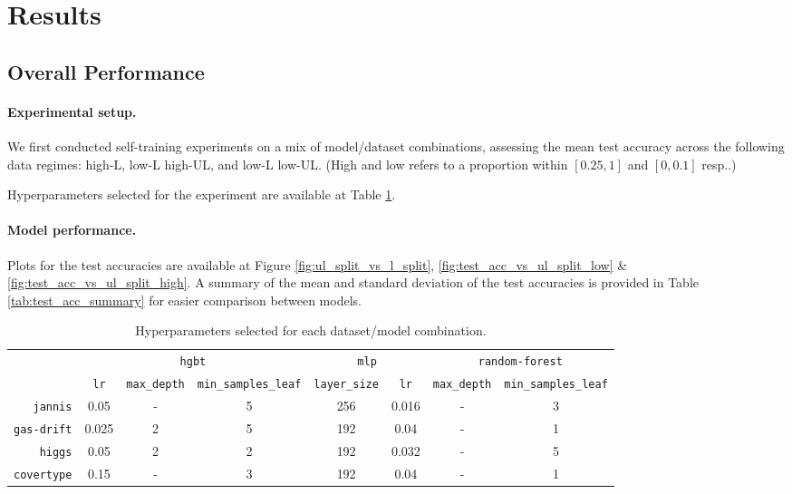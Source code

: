 \documentclass{article}
\begin{document}
\section{Results}\label{sec:res}

\subsection{Overall Performance}\label{sec:overall-perf}

\paragraph{Experimental setup.}
We first conducted self-training experiments on a mix of model/dataset combinations,
assessing the mean test accuracy across the following data regimes: high-L, low-L
high-UL, and low-L low-UL.
(High and low refers to a proportion within $[0.25, 1]$ and $[0, 0.1]$ resp..)

Hyperparameters selected for the experiment are available at Table
\ref{tab:test_acc_hyperparams}.

\paragraph{Model performance.}
Plots for the test accuracies are available at Figure \ref{fig:ul_split_vs_l_split},
\ref{fig:test_acc_vs_ul_split_low} \& \ref{fig:test_acc_vs_ul_split_high}.
A summary of the mean and standard deviation of the test accuracies is provided in Table
\ref{tab:test_acc_summary} for easier comparison between models.

\clearpage

\begin{table}[htbp]
  \centering
  \caption{Hyperparameters selected for each dataset/model combination.}
  \label{tab:test_acc_hyperparams}
  \small
  \begin{tabular}{rccccccc}
    \toprule
    & \multicolumn{3}{c}{\normalsize\texttt{hgbt}} & \multicolumn{2}{c}{\normalsize\texttt{mlp}} & \multicolumn{2}{c}{\normalsize\texttt{random-forest}} \\
    \cmidrule(lr){2-4}
    \cmidrule(lr){5-6}
    \cmidrule(lr){7-8}
    & \texttt{lr} & \texttt{max\_depth} & \tiny\texttt{min\_samples\_leaf} & \texttt{layer\_size} & \texttt{lr} & \texttt{max\_depth} & \tiny\texttt{min\_samples\_leaf} \\
    \midrule
    \texttt{jannis} & 0.05 & - & 5 & 256 & 0.016 & - & 3 \\
    \texttt{gas-drift} & 0.025 & 2 & 5 & 192 & 0.04 & - & 1 \\
    \texttt{higgs} & 0.05 & 2 & 2 & 192 & 0.032 & - & 5 \\
    \texttt{covertype} & 0.15 & - & 3 & 192 & 0.04 & - & 1 \\
    \bottomrule
  \end{tabular}
\end{table}
\end{document}

